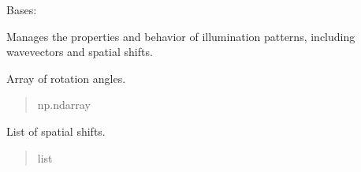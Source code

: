 \documentclass[letterpaper,10pt,english]{sphinxmanual}
\begin{document}
\begin{fulllineitems}
\label{\detokenize{source/Illumination:Illumination.Illumination}}
\pysigstartsignatures
\pysiglinewithargsret
{}
{\sphinxparamcomma {}}
{}
\pysigstopsignatures
\sphinxAtStartPar
Bases: 

\sphinxAtStartPar
Manages the properties and behavior of illumination patterns, including wavevectors and spatial shifts.

\begin{fulllineitems}
\label{\detokenize{source/Illumination:Illumination.Illumination.angles}}
\pysigstartsignatures
\pysigline
{}
\pysigstopsignatures
\sphinxAtStartPar
Array of rotation angles.
\begin{quote}\begin{description}
\sphinxAtStartPar
np.ndarray

\end{description}\end{quote}

\end{fulllineitems}


\begin{fulllineitems}
\label{\detokenize{source/Illumination:Illumination.Illumination._spatial_shifts}}
\pysigstartsignatures
\pysigline
{}
\pysigstopsignatures
\sphinxAtStartPar
List of spatial shifts.
\begin{quote}\begin{description}
\sphinxAtStartPar
list


\end{description}
\end{quote}
\end{fulllineitems}
\end{fulllineitems}
\end{document}
